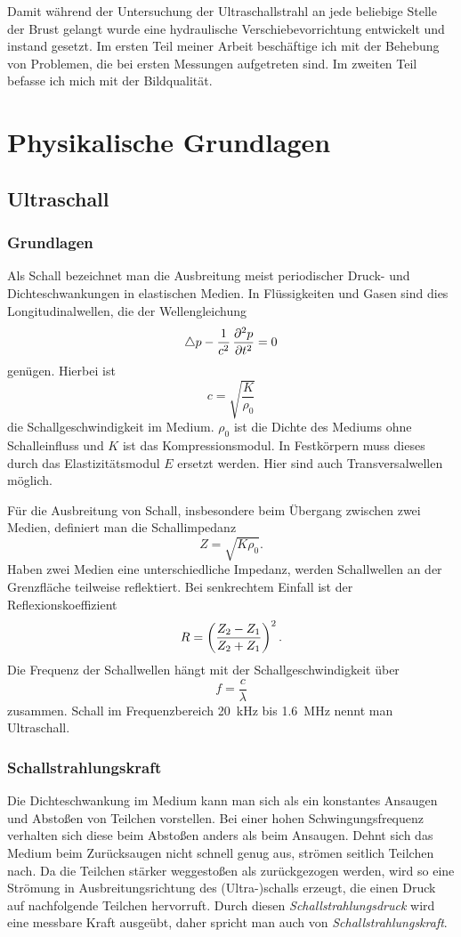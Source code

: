 \documentclass[
    11pt,
    ngerman
]{scrreprt}
\begin{document}
Damit während der Untersuchung der Ultraschallstrahl an jede beliebige Stelle
der Brust gelangt wurde eine hydraulische Verschiebevorrichtung entwickelt und
instand gesetzt. Im ersten Teil meiner Arbeit beschäftige ich mit der Behebung
von Problemen, die bei ersten Messungen aufgetreten sind. Im zweiten Teil
befasse ich mich mit der Bildqualität.

\chapter{Physikalische Grundlagen}

\section{Ultraschall}

\subsection{Grundlagen}

Als Schall bezeichnet man die Ausbreitung meist periodischer Druck- und
Dichteschwankungen in elastischen Medien. In Flüssigkeiten und Gasen sind dies
Longitudinalwellen, die der Wellengleichung
\[
    \laplace p - \frac1{c^2}\dpd[2]pt = 0
\]
genügen. Hierbei ist
\[
    c=\sqrt{\frac{K}{\rho_0}}
\]
die Schallgeschwindigkeit im Medium. $\rho_0$ ist die Dichte des Mediums ohne
Schalleinfluss und $K$ ist das Kompressionsmodul. In Festkörpern muss dieses
durch das Elastizitätsmodul $E$ ersetzt werden. Hier sind auch
Transversalwellen möglich.

Für die Ausbreitung von Schall, insbesondere beim Übergang zwischen zwei
Medien, definiert man die Schallimpedanz
\[
    Z=\sqrt{K\rho_0}.
\]
Haben zwei Medien eine unterschiedliche Impedanz, werden Schallwellen an der
Grenzfläche teilweise reflektiert. Bei senkrechtem Einfall ist der
Reflexionskoeffizient
\[
    R=\del{\frac{Z_2-Z_1}{Z_2+Z_1}}^2.
\]
Die Frequenz der Schallwellen hängt mit der Schallgeschwindigkeit über
\[
    f = \frac c\lambda
\]
zusammen. Schall im Frequenzbereich \SI{20}{\kilo\hertz} bis
\SI{1.6}{\mega\hertz} nennt man Ultraschall.

\subsection{Schallstrahlungskraft}

Die Dichteschwankung im Medium kann man sich als ein konstantes Ansaugen und
Abstoßen von Teilchen vorstellen. Bei einer hohen Schwingungsfrequenz verhalten
sich diese beim Abstoßen anders als beim Ansaugen. Dehnt sich das Medium beim
Zurücksaugen nicht schnell genug aus, strömen seitlich Teilchen nach. Da die
Teilchen stärker weggestoßen als zurückgezogen werden, wird so eine Strömung in
Ausbreitungsrichtung des (Ultra-)schalls erzeugt, die einen Druck auf
nachfolgende Teilchen hervorruft. Durch diesen \emph{Schallstrahlungsdruck}
wird eine messbare Kraft ausgeübt, daher spricht man auch von
\emph{Schallstrahlungskraft}. 
\end{document}
